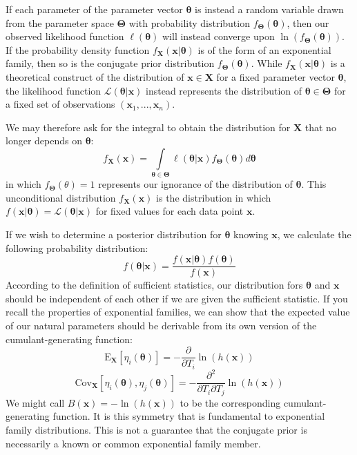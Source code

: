 \documentclass[10pt, a5paper, twoside, openright]{memoir}
\begin{document}
If each parameter of the parameter vector $\boldsymbol \theta$ is instead a random variable drawn from the parameter space $\boldsymbol \Theta$ with probability distribution $f_{\boldsymbol \Theta}(\boldsymbol \theta)$, then our observed likelihood function $\ell(\boldsymbol \theta)$ will instead converge upon $\ln(f_{\boldsymbol \Theta}(\boldsymbol \theta))$. If the probability density function $f_{\boldsymbol X}(\boldsymbol x | \boldsymbol \theta)$ is of the form of an exponential family, then so is the conjugate prior distribution $f_{\boldsymbol \Theta}(\boldsymbol \theta)$. While $f_{\boldsymbol X}(\boldsymbol x | \boldsymbol \theta)$ is a theoretical construct of the distribution of $\boldsymbol x \in \boldsymbol X$ for a fixed parameter vector $\boldsymbol \theta$, the likelihood function $\mathcal L(\boldsymbol \theta | \boldsymbol x)$ instead represents the distribution of $\boldsymbol \theta \in \boldsymbol \Theta$ for a fixed set of observations $(\boldsymbol x_1,...,\boldsymbol x_n)$. 

We may therefore ask for the integral to obtain the distribution for $\boldsymbol X$ that no longer depends on $\boldsymbol \theta$:
$$f_{\boldsymbol X}(\boldsymbol x) =\int\limits_{\boldsymbol \theta \in \boldsymbol \Theta} \ell(\boldsymbol \theta | \boldsymbol x) f_{\boldsymbol \Theta}(\boldsymbol \theta) d \boldsymbol \theta$$
in which $f_{\boldsymbol \Theta}(\theta) = 1$ represents our ignorance of the distribution of $\boldsymbol \theta$. This unconditional distribution $f_{\boldsymbol X}(\boldsymbol x)$ is the distribution in which $f(\boldsymbol x | \boldsymbol \theta) = \mathcal L( \boldsymbol \theta | \boldsymbol x)$ for fixed values for each data point $\boldsymbol x$.

If we wish to determine a posterior distribution for $\boldsymbol \theta$ knowing $\boldsymbol x$, we calculate the following probability distribution:
$$f(\boldsymbol \theta | \boldsymbol x) = \frac{f(\boldsymbol x | \boldsymbol \theta) f(\boldsymbol \theta)}{f(\boldsymbol x)} $$
According to the definition of sufficient statistics, our distribution fors $\boldsymbol \theta$ and $\boldsymbol x$ should be independent of each other if we are given the sufficient statistic.
If you recall the properties of exponential families, we can show that the expected value of our natural parameters should be derivable from its own version of the cumulant-generating function:
$$\mathrm{E}_{\boldsymbol X}[\eta_i(\boldsymbol \theta)] = -\frac{\partial}{\partial T_i} \ln(h(\boldsymbol x))$$
$$\mathrm{Cov}_{\boldsymbol X}[\eta_i(\boldsymbol \theta), \eta_j(\boldsymbol \theta)] = -\frac{\partial^2}{\partial T_i \partial T_j} \ln(h(\boldsymbol x)) $$
We might call $B(\boldsymbol x) = -\ln(h(\boldsymbol x))$ to be the corresponding cumulant-generating function. It is this symmetry that is fundamental to exponential family distributions. This is not a guarantee that the conjugate prior is necessarily a known or common exponential family member.
\end{document}

